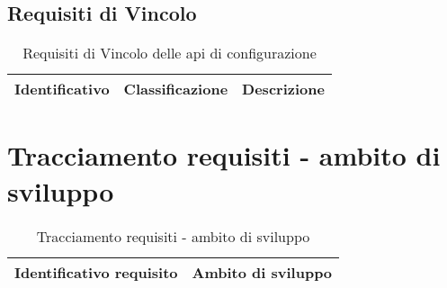 \subsection{Requisiti di Vincolo}
{
\centering
\begin{longtable}{L{3cm} L{3cm} L{7.5cm}}
\caption{Requisiti di Vincolo delle \gls{api} di configurazione}\\
\textbf{Identificativo} &
\textbf{Classificazione}&
\textbf{Descrizione}\\
\endhead
\hline
\hline
\end{longtable}
}


\section{Tracciamento requisiti - ambito di sviluppo}
{
\centering
\begin{longtable}{L{5cm} L{8.5cm}}
\caption{Tracciamento requisiti - ambito di sviluppo}\\
\textbf{Identificativo requisito} &
\textbf{Ambito di sviluppo}\\
\endhead
\hline


\end{longtable}}
